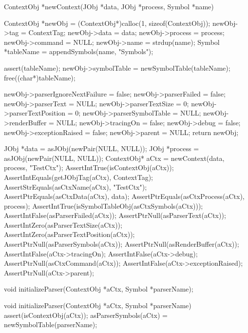 \startCCode
ContextObj *newContext(JObj *data, JObj *process, Symbol *name) {
  ContextObj *newObj =
    (ContextObj*)calloc(1, sizeof(ContextObj));
  newObj->tag                = ContextTag;
  newObj->data               = data;
  newObj->process            = process;
  newObj->command            = NULL;
  newObj->name               = strdup(name);
  Symbol *tableName          = appendSymbols(name, "Symbols");
  
  assert(tableName);
  newObj->symbolTable        = newSymbolTable(tableName);
  free((char*)tableName);
  
  newObj->parserIgnoreNextFailure = false;
  newObj->parserFailed            = false;
  newObj->parserText              = NULL;
  newObj->parserTextSize          = 0;
  newObj->parserTextPosition      = 0;
  newObj->parserSymbolTable       = NULL;
  newObj->renderBuffer            = NULL;
  newObj->tracingOn               = false;
  newObj->debug                   = false;
  newObj->exceptionRaised         = false;
  newObj->parent                  = NULL;
  return newObj;
}
\stopCCode


\startCTest
  JObj *data       = asJObj(newPair(NULL, NULL));
  JObj *process    = asJObj(newPair(NULL, NULL));
  ContextObj* aCtx = newContext(data, process, "TestCtx");
  AssertIntTrue(isContextObj(aCtx));
  AssertIntEquals(getJObjTag(aCtx), ContextTag);
  AssertStrEquals(asCtxName(aCtx), "TestCtx");
  AssertPtrEquals(asCtxData(aCtx), data);
  AssertPtrEquals(asCtxProcess(aCtx), process);
  AssertIntTrue(isSymbolTableObj(asCtxSymbols(aCtx)));
  AssertIntFalse(asParserFailed(aCtx));
  AssertPtrNull(asParserText(aCtx));
  AssertIntZero(asParserTextSize(aCtx));
  AssertIntZero(asParserTextPosition(aCtx));
  AssertPtrNull(asParserSymbols(aCtx));
  AssertPtrNull(asRenderBuffer(aCtx));
  AssertIntFalse(aCtx->tracingOn);
  AssertIntFalse(aCtx->debug);
  AssertPtrNull(asCtxCommand(aCtx));
  AssertIntFalse(aCtx->exceptionRaised);
  AssertPtrNull(aCtx->parent);
\stopCTest
\stopTestCase
\stopTestSuite

\startTestSuite[initializeParser]

\startCHeader
void initializeParser(ContextObj *aCtx, Symbol *parserName);
\stopCHeader

\startCCode
void initializeParser(ContextObj *aCtx, Symbol *parserName) {
  assert(isContextObj(aCtx));
  asParserSymbols(aCtx) = newSymbolTable(parserName);
}
\stopCCode


